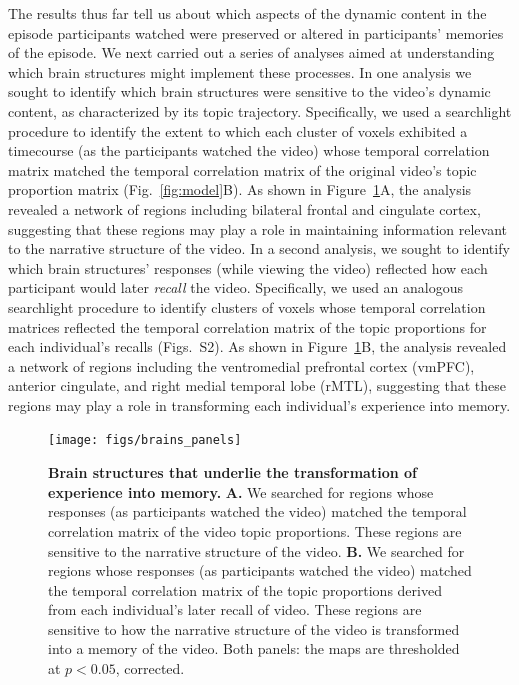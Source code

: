 \documentclass{article}
\newcommand{\corrmats}{S2}
\begin{document}
The results thus far tell us about which aspects of the dynamic content in the episode participants watched were preserved or altered in participants' memories of the episode.  We next carried out a series of analyses aimed at understanding which brain structures might implement these processes.  In one analysis we sought to identify which brain structures were sensitive to the video's dynamic content, as characterized by its topic trajectory.  Specifically, we used a searchlight procedure to identify the extent to which each cluster of voxels exhibited a timecourse (as the participants watched the video) whose temporal correlation matrix matched the temporal correlation matrix of the original video's topic proportion matrix (Fig.~\ref{fig:model}B).  As shown in Figure~\ref{fig:brainz}A, the analysis revealed a network of regions including bilateral frontal and cingulate cortex, suggesting that these regions may play a role in maintaining information relevant to the narrative structure of the video.  In a second analysis, we sought to identify which brain structures' responses (while viewing the video) reflected how each participant would later \textit{recall} the video.  Specifically, we used an analogous searchlight procedure to identify clusters of voxels whose temporal correlation matrices reflected the temporal correlation matrix of the topic proportions for each individual's recalls (Figs.~\corrmats).  As shown in Figure~\ref{fig:brainz}B, the analysis revealed a network of regions including the ventromedial prefrontal cortex (vmPFC), anterior cingulate, and right medial temporal lobe (rMTL), suggesting that these regions may play a role in transforming each individual's experience into memory.

\begin{figure}[tp]
\centering
\texttt{[image: figs/brains\_panels]}
\caption{\small \textbf{Brain structures that underlie the transformation of experience into memory.} \textbf{A.} We searched for regions whose responses (as participants watched the video) matched the temporal correlation matrix of the video topic proportions.  These regions are sensitive to the narrative structure of the video.  \textbf{B.} We searched for regions whose responses (as participants watched the video) matched the temporal correlation matrix of the topic proportions derived from each individual's later recall of video.  These regions are sensitive to how the narrative structure of the video is transformed into a memory of the video.  Both panels: the maps are thresholded at $p < 0.05$, corrected.}
\label{fig:brainz}
\end{figure}
\end{document}
